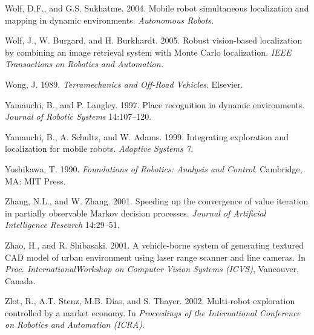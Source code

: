 \documentclass[10pt,a4paper]{article}
\begin{document}
Wolf, D.F., and G.S. Sukhatme. 2004. Mobile robot simultaneous localization and
mapping in dynamic environments. \textit{Autonomous Robots.}

Wolf, J., W. Burgard, and H. Burkhardt. 2005. Robust vision-based localization by
combining an image retrieval system with Monte Carlo localization. \textit{IEEE Transactions
on Robotics and Automation.}

Wong, J. 1989. \textit{Terramechanics and Off-Road Vehicles}. Elsevier.

Yamauchi, B., and P. Langley. 1997. Place recognition in dynamic environments.
\textit{Journal of Robotic Systems} 14:107–120.

Yamauchi, B., A. Schultz, and W. Adams. 1999. Integrating exploration and localization
for mobile robots. \textit{Adaptive Systems 7.}

Yoshikawa, T. 1990. \textit{Foundations of Robotics: Analysis and Control}. Cambridge, MA:
MIT Press.

Zhang, N.L., and W. Zhang. 2001. Speeding up the convergence of value iteration
in partially observable Markov decision processes. \textit{Journal of Artificial Intelligence
Research }14:29–51.

Zhao, H., and R. Shibasaki. 2001. A vehicle-borne system of generating textured
CAD model of urban environment using laser range scanner and line cameras. In
\textit{Proc. InternationalWorkshop on Computer Vision Systems (ICVS)}, Vancouver, Canada.

Zlot, R., A.T. Stenz, M.B. Dias, and S. Thayer. 2002. Multi-robot exploration controlled
by a market economy. In \textit{Proceedings of the International Conference on Robotics and
Automation (ICRA)}.


 
\end{document}
